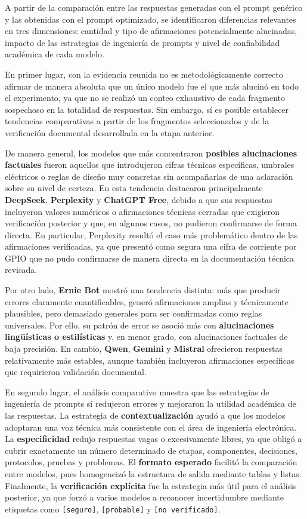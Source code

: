 \documentclass[11pt,a4paper]{article}
\begin{document}
A partir de la comparación entre las respuestas generadas con el prompt genérico y las obtenidas con el prompt optimizado, se identificaron diferencias relevantes en tres dimensiones: cantidad y tipo de afirmaciones potencialmente alucinadas, impacto de las estrategias de ingeniería de prompts y nivel de confiabilidad académica de cada modelo.

En primer lugar, con la evidencia reunida no es metodológicamente correcto afirmar de manera absoluta que un único modelo fue el que más alucinó en todo el experimento, ya que no se realizó un conteo exhaustivo de cada fragmento sospechoso en la totalidad de respuestas. Sin embargo, sí es posible establecer tendencias comparativas a partir de los fragmentos seleccionados y de la verificación documental desarrollada en la etapa anterior.

De manera general, los modelos que más concentraron \textbf{posibles alucinaciones factuales} fueron aquellos que introdujeron cifras técnicas específicas, umbrales eléctricos o reglas de diseño muy concretas sin acompañarlas de una aclaración sobre su nivel de certeza. En esta tendencia destacaron principalmente \textbf{DeepSeek}, \textbf{Perplexity} y \textbf{ChatGPT Free}, debido a que sus respuestas incluyeron valores numéricos o afirmaciones técnicas cerradas que exigieron verificación posterior y que, en algunos casos, no pudieron confirmarse de forma directa. En particular, Perplexity resultó el caso más problemático dentro de las afirmaciones verificadas, ya que presentó como segura una cifra de corriente por GPIO que no pudo confirmarse de manera directa en la documentación técnica revisada.

Por otro lado, \textbf{Ernie Bot} mostró una tendencia distinta: más que producir errores claramente cuantificables, generó afirmaciones amplias y técnicamente plausibles, pero demasiado generales para ser confirmadas como reglas universales. Por ello, su patrón de error se asoció más con \textbf{alucinaciones lingüísticas o estilísticas} y, en menor grado, con alucinaciones factuales de baja precisión. En cambio, \textbf{Qwen}, \textbf{Gemini} y \textbf{Mistral} ofrecieron respuestas relativamente más estables, aunque también incluyeron afirmaciones específicas que requirieron validación documental.

En segundo lugar, el análisis comparativo muestra que las estrategias de ingeniería de prompts sí redujeron errores y mejoraron la utilidad académica de las respuestas. La estrategia de \textbf{contextualización} ayudó a que los modelos adoptaran una voz técnica más consistente con el área de ingeniería electrónica. La \textbf{especificidad} redujo respuestas vagas o excesivamente libres, ya que obligó a cubrir exactamente un número determinado de etapas, componentes, decisiones, protocolos, pruebas y problemas. El \textbf{formato esperado} facilitó la comparación entre modelos, pues homogeneizó la estructura de salida mediante tablas y listas. Finalmente, la \textbf{verificación explícita} fue la estrategia más útil para el análisis posterior, ya que forzó a varios modelos a reconocer incertidumbre mediante etiquetas como \texttt{[seguro]}, \texttt{[probable]} y \texttt{[no verificado]}.
\end{document}
